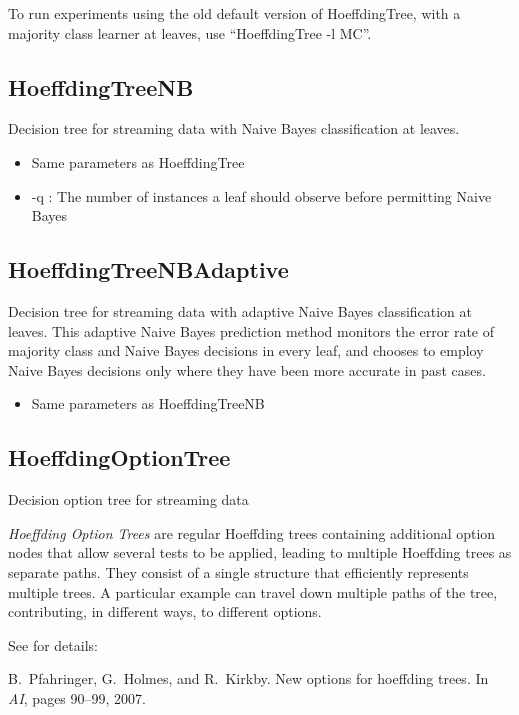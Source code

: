 \documentclass[a4paper,12pt,twoside]{book}
\begin{document}
To run experiments using the old default version of HoeffdingTree, with a majority class learner at leaves, 
use ``HoeffdingTree -l MC''. 

\BEGINOMIT
\subsection{HoeffdingTreeNB} Decision tree for streaming data with Naive Bayes classification at leaves.

\begin{itemize}
\item Same parameters as HoeffdingTree
\item -q : The number of instances a leaf should observe before permitting Naive Bayes
\end{itemize}

\subsection{HoeffdingTreeNBAdaptive} Decision tree for streaming data with adaptive Naive Bayes classification at leaves.
This adaptive Naive Bayes prediction method monitors
the error rate of majority class and Naive Bayes decisions in every
leaf, and chooses to employ Naive Bayes decisions only where they have been
more accurate in past cases.

\begin{itemize}
\item Same parameters as HoeffdingTreeNB
\end{itemize}
\ENDOMIT

\subsection{HoeffdingOptionTree} Decision option tree for streaming data

{\em Hoeffding Option Trees} are regular Hoeffding trees 
containing additional option nodes that allow several tests to be applied, 
leading to multiple Hoeffding trees as separate paths. 
They consist of a single structure that efficiently represents multiple
trees. A particular example can travel down multiple paths of the tree, contributing, 
in different ways, to different options.

See for details:
\begin{itemize}
B.~Pfahringer, G.~Holmes, and R.~Kirkby.
\newblock New options for hoeffding trees.
\newblock In {\em AI}, pages 90--99, 2007.\end{itemize}
\end{document}
